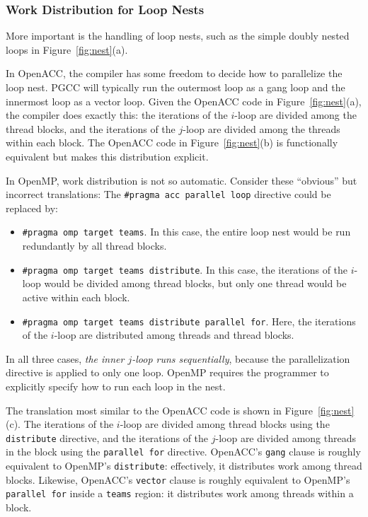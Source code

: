 \documentclass{sig-alternate-05-2015}
\newcommand{\squish}{
     { \setlength{\itemsep}{0pt}      \setlength{\parsep}{3pt}
       \setlength{\topsep}{3pt}       \setlength{\partopsep}{0pt}
       \setlength{\leftmargin}{1.5em} \setlength{\labelwidth}{1em}
       \setlength{\labelsep}{0.5em} } }
\begin{document}
\subsubsection{Work Distribution for Loop Nests}
\label{sec:nests}

More important is the handling of loop nests, such as the simple
doubly nested loops in Figure~\ref{fig:nest}(a).

In OpenACC, the compiler has some freedom to decide how to parallelize the loop
nest.  PGCC will typically run the outermost loop as a gang loop and the
innermost loop as a vector loop.  Given the OpenACC code in
Figure~\ref{fig:nest}(a), the compiler does exactly this: the iterations of the
$i$-loop are divided among the thread blocks, and the iterations of the
$j$-loop are divided among the threads within each block.  The OpenACC code in
Figure~\ref{fig:nest}(b) is functionally equivalent but makes this distribution
explicit.

In OpenMP, work distribution is not so automatic.  Consider these ``obvious''
but incorrect translations: The \texttt{\#pragma acc parallel loop} directive
could be replaced by:
\begin{itemize}\squish
\item \texttt{\#pragma omp target teams}.  In this case, the entire loop
nest would be run redundantly by all thread blocks.
\item \texttt{\#pragma omp target teams distribute}.  In this case, the
iterations of the $i$-loop would be divided among thread blocks, but only
one thread would be active within each block.
\item \texttt{\#pragma omp target teams distribute parallel for}.  Here,
the iterations of the $i$-loop are distributed among threads and thread blocks.
\end{itemize}
In all three cases, \emph{the inner $j$-loop runs sequentially}, because the
parallelization directive is applied to only one loop.  OpenMP requires the
programmer to explicitly specify how to run each loop in the nest.

The translation most similar to the OpenACC code is shown in
Figure~\ref{fig:nest}(c).  The iterations of the $i$-loop are divided among
thread blocks using the \texttt{distribute} directive, and the iterations of
the $j$-loop are divided among threads in the block using the \texttt{parallel
for} directive.
%
OpenACC's \texttt{gang} clause is roughly equivalent to OpenMP's
\texttt{distribute}: effectively, it distributes work among thread blocks.
Likewise, OpenACC's \texttt{vector} clause is roughly equivalent to OpenMP's
\texttt{parallel for} inside a \texttt{teams} region: it distributes work among
threads within a block.
\end{document}
